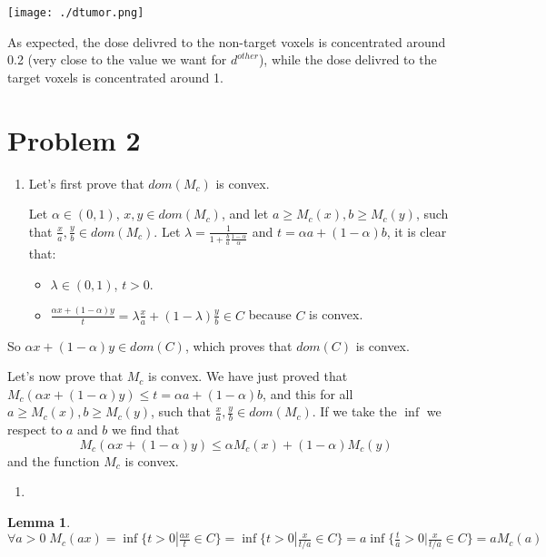 \documentclass[11pt]{article}
\newtheorem{thm}{Lemma}
\begin{document}
\begin{center}
\texttt{[image: ./dtumor.png]}
\end{center}

As expected, the dose delivred to the non-target voxels is concentrated around 0.2 (very close to the value we want for \(d^{other}\)), while the dose delivred to the target voxels is concentrated around 1.


\section{Problem 2}
\label{sec:orgheadline2}
\begin{enumerate}
\item Let's first prove that \(dom(M_c)\) is convex.

Let \(\alpha \in (0, 1)\), \(x, y \in dom(M_c)\), and let \(a \ge M_c(x), b \ge M_c(y)\), such that \(\frac xa, \frac yb \in dom(M_c)\). 
Let \(\lambda = \frac1 { 1  + \frac ba \frac{1-\alpha}\alpha}\) and \(t = \alpha a + (1-\alpha) b\), it is clear that:
\begin{itemize}
\item \(\lambda \in (0, 1)\), \(t > 0\).
\item \(\frac{\alpha x + (1-\alpha) y}t = \lambda \frac xa + (1-\lambda) \frac yb \in C\) because \(C\) is convex.
\end{itemize}
\end{enumerate}
So \(\alpha x + (1-\alpha)y \in dom(C)\), which proves that \(dom(C)\) is convex.

Let's now prove that \(M_c\) is convex. We have just proved that \(M_c(\alpha x + (1-\alpha)y) \le t = \alpha a + (1-\alpha) b\), and this for all \(a \ge M_c(x), b \ge M_c(y)\), such that \(\frac xa, \frac yb \in dom(M_c)\). If we take the \(\inf\) we respect to \(a\) and \(b\) we find that
$$M_c(\alpha x + (1-\alpha)y) \le \alpha M_c(x) + (1-\alpha) M_c(y)$$
and the function \(M_c\) is convex.

\begin{enumerate}
\item 
\end{enumerate}

\begin{thm}
\(\forall a > 0 \; M_c(a x) = \inf \{ t > 0 | \frac {ax}t \in C\} =  \inf \{ t > 0 | \frac {x}{t/a} \in C\} = a  \inf \{ \frac{t}a > 0 | \frac {x}{t/a} \in C\} = a M_c(a)\)
\end{thm}
\end{document}
